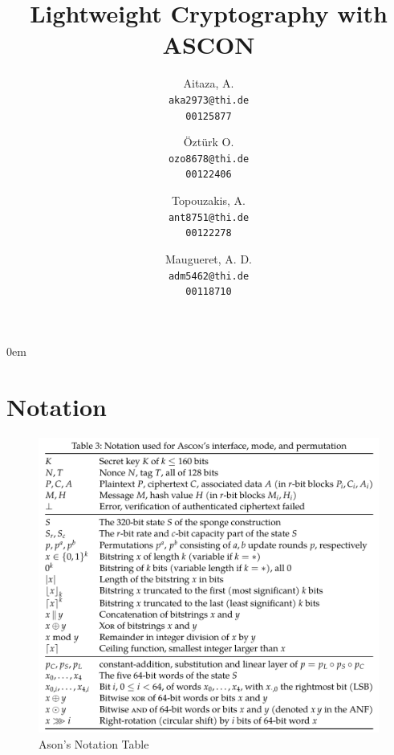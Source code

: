 \documentclass[a4paper]{article}
\begin{document}
\begin{titlepage}

  \title{ \Huge Lightweight Cryptography with ASCON}
  \author{
    Aitaza, A. \\
    \texttt{aka2973@thi.de} \\
    \texttt{00125877}
    \and
    Öztürk O.\\
    \texttt{ozo8678@thi.de} \\
    \texttt{00122406}   
    \and
    Topouzakis, A. \\
    \texttt{ant8751@thi.de} \\
    \texttt{00122278}
    \and
    Maugueret, A. D.\\
    \texttt{adm5462@thi.de} \\
    \texttt{00118710}
    }
  \clearpage\maketitle
  \thispagestyle{empty}

\end{titlepage}

\restoregeometry

\newpage
{}
\tableofcontents
\restoregeometry
\newpage
\listoffigures
\newpage
{} 

\topmargin-20mm
\hoffset-15mm
\textwidth15.5cm
\parindent0em

\thispagestyle{empty}
\section{Notation}

\begin{figure}[H] 
    \centering 
    \includegraphics[width=1\textwidth]{figures/ascon-notation.png}
    \caption{Ason's Notation Table \cite{DBLP:journals/joc/DobraunigEMS21}}
    \label{fig:ascon-notation} 
  \end{figure}








\newpage
\printbibliography
\newpage


\end{document}
